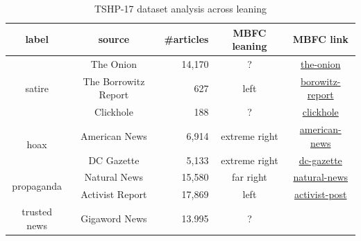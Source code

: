 \begin{table}[!htbp]
    \centering
    \begin{tabular}{c|c|r|c|c}
        label & source & \#articles & MBFC leaning & MBFC link \\
        \hline
        \multirow{3}{*}{satire} & The Onion & 14,170 & ? & \href{https://mediabiasfactcheck.com/the-onion/}{the-onion} \\
                                & The Borrowitz Report & 627 & left & \href{https://mediabiasfactcheck.com/borowitz-report/}{borowitz-report} \\
                                & Clickhole & 188 & ? & \href{https://mediabiasfactcheck.com/clickhole/}{clickhole} \\
        \hline
        \multirow{2}{*}{hoax} & American News & 6,914 & extreme right & \href{https://mediabiasfactcheck.com/anews-24-com-american-news/}{american-news} \\
                                & DC Gazette & 5,133 & extreme right & \href{https://mediabiasfactcheck.com/dc-gazette/}{dc-gazette} \\
        \hline
        \multirow{2}{*}{propaganda} & Natural News & 15,580 & far right & \href{https://mediabiasfactcheck.com/natural-news/}{natural-news} \\
                                & Activist Report & 17,869 & left & \href{https://mediabiasfactcheck.com/activist-post/}{activist-post} \\
        \hline
        trusted news & Gigaword News & 13.995 & ? & 
    \end{tabular}
    \caption{TSHP-17 dataset analysis across leaning}
    \label{tab:tshp17_across_leaning}
\end{table}




